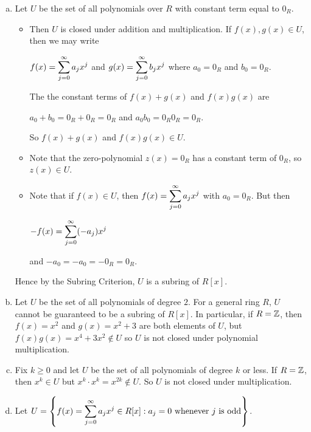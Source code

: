 \documentclass[11pt,fleqn,dvipsnames,usenames]{article}
\newcommand{\p}{\noindent}
\begin{document}
\begin{enumerate}[1.]
\solution
\begin{enumerate}[(a)]
\item Let $U$ be the set of all polynomials over $R$ with constant term equal to $0_{R}$.
\begin{itemize}
\item Then $U$ is closed under addition and multiplication.  If $f(x),g(x)\in U$, then we may write
\begin{center}
$f(x) = \displaystyle\sum\limits_{j=0}^{\infty}a_{j}x^{j}$ and $g(x) = \displaystyle\sum\limits_{j=0}^{\infty}b_{j}x^{j}$ where $a_{0} = 0_{R}$ and $b_{0} = 0_{R}$.
\end{center}
The the constant terms of $f(x) + g(x)$ and $f(x)g(x)$ are
\begin{center}
$a_{0} + b_{0} = 0_{R} + 0_{R} = 0_{R}$ and $a_{0}b_{0} = 0_{R}0_{R} = 0_{R}$.
\end{center}
So $f(x)+g(x)$ and $f(x)g(x)\in U$.

\item Note that the zero-polynomial $z(x) = 0_{R}$ has a constant term of $0_{R}$, so $z(x)\in U$.

\item Note that if $f(x)\in U$, then $f(x) = \displaystyle\sum\limits_{j=0}^{\infty}a_{j}x^{j}$ with $a_{0} = 0_{R}$.  But then
\begin{center}
$-f(x) = \displaystyle\sum\limits_{j=0}^{\infty}(-a_{j})x^{j}$
\end{center}
and $-a_{0} = -a_{0} = -0_{R} = 0_{R}$.
\end{itemize}

\p Hence by the Subring Criterion, $U$ is a subring of $R[x]$.

\item Let $U$ be the set of all polynomials of degree $2$.  For a general ring $R$, $U$ cannot be guaranteed to be a subring of $R[x]$.  In particular, if $R=\mathbb{Z}$, then $f(x) = x^2$ and $g(x) = x^2 + 3$ are both elements of $U$, but $f(x)g(x) = x^4 + 3x^2\notin U$ so $U$ is not closed under polynomial multiplication.

\item Fix $k\geq 0$ and let $U$ be the set of all polynomials of degree $k$ or less.  If $R = \mathbb{Z}$, then $x^{k}\in U$ but $x^{k}\cdot x^{k} = x^{2k}\notin U$.  So $U$ is not closed under multiplication.

\item Let $U = \left\{f(x)=\displaystyle\sum\limits_{j=0}^{\infty}a_{j}x^{j}\in R[x]:a_{j} = 0\text{ whenever }j\text{ is odd}\right\}$.
\vsp


\end{enumerate}
\end{enumerate}
\end{document}
